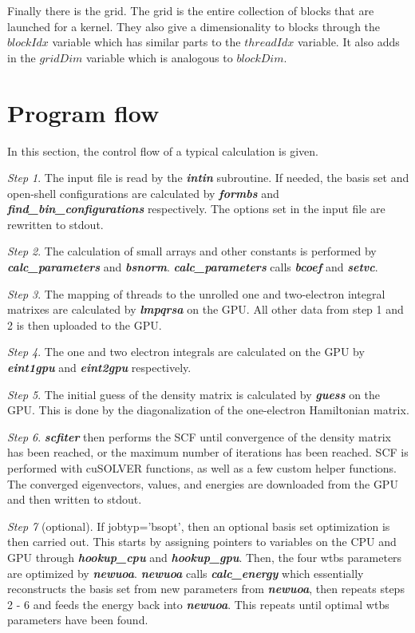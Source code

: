 \documentclass[12pt]{book}
\begin{document}
Finally there is the grid. The grid is the entire collection of blocks that are launched for a kernel. They also give a dimensionality to blocks through the $blockIdx$ variable which has similar parts to the $threadIdx$ variable. It also adds in the $gridDim$ variable which is analogous to $blockDim$.  

\section{Program flow}
In this section, the control flow of a typical calculation is given.

\textit{Step 1}. The input file is read by the \textit{\textbf{intin}} subroutine. If needed, the basis set and open-shell configurations are calculated by \textit{\textbf{formbs}} and \textit{\textbf{find\_bin\_configurations}} respectively. The options set in the input file are rewritten to stdout.

\textit{Step 2}. The calculation of small arrays and other constants is performed by \textit{\textbf{calc\_parameters}} and \textit{\textbf{bsnorm}}. \textit{\textbf{calc\_parameters}} calls \textit{\textbf{bcoef}} and \textit{\textbf{setvc}}.

\textit{Step 3}. The mapping of threads to the unrolled one and two-electron integral matrixes are calculated by \textit{\textbf{lmpqrsa}} on the GPU. All other data from step 1 and 2 is then uploaded to the GPU.

\textit{Step 4}. The one and two electron integrals are calculated on the GPU by \textit{\textbf{eint1gpu}} and \textit{\textbf{eint2gpu}} respectively.

\textit{Step 5}. The initial guess of the density matrix is calculated by \textit{\textbf{guess}} on the GPU. This is done by the diagonalization of the one-electron Hamiltonian matrix.

\textit{Step 6}. \textit{\textbf{scfiter}} then performs the SCF until convergence of the density matrix has been reached, or the maximum number of iterations has been reached. SCF is performed with cuSOLVER functions, as well as a few custom helper functions. The converged eigenvectors, values, and energies are downloaded from the GPU and then written to stdout.

\textit{Step 7} (optional). If jobtyp='bsopt', then an optional basis set optimization is then carried out. This starts by assigning pointers to variables on the CPU and GPU through \textit{\textbf{hookup\_cpu}} and \textit{\textbf{hookup\_gpu}}. Then, the four wtbs parameters are optimized by \textit{\textbf{newuoa}}. \textit{\textbf{newuoa}} calls \textit{\textbf{calc\_energy}} which essentially reconstructs the basis set from new parameters from \textit{\textbf{newuoa}}, then repeats steps 2 - 6 and feeds the energy back into \textit{\textbf{newuoa}}. This repeats until optimal wtbs parameters have been found.
\end{document}
